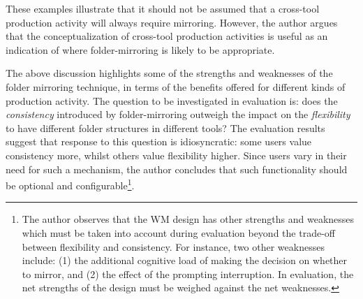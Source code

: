 \begin{itemize}

These examples illustrate that it should not be assumed that a cross-tool production activity will always require mirroring.  However, the author argues that the conceptualization of cross-tool production activities is useful as an indication of where folder-mirroring is likely to be appropriate.

\end{itemize}





The above discussion highlights some of the strengths and weaknesses of the folder mirroring technique, in terms of the benefits offered for different kinds of production activity.  The question to be investigated in evaluation is: does the \textit{consistency} introduced by folder-mirroring outweigh the impact on the \textit{flexibility} to have different folder structures in different tools?  The evaluation results suggest that response to this question is idiosyncratic: some users value consistency more, whilst others value flexibility higher.  Since users vary in their need for such a mechanism, the author concludes that such functionality should be optional and configurable\footnote{The author observes that the WM design has other strengths and weaknesses which must be taken into account during evaluation beyond the trade-off between flexibility and consistency.  For instance, two other weaknesses include: (1) the additional cognitive load of making the decision on whether to mirror, and (2) the effect of the prompting interruption.  In evaluation, the net strengths of the design must be weighed against the net weaknesses.}.  



